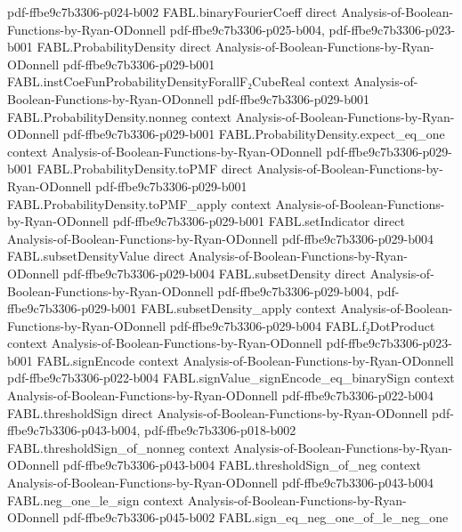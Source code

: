 \begin{theorem}
  {pdf-ffbe9c7b3306-p024-b002}
\proofstep
  {FABL.binaryFourierCoeff}
  {direct}
  {Analysis-of-Boolean-Functions-by-Ryan-ODonnell}
  {pdf-ffbe9c7b3306-p025-b004,
    pdf-ffbe9c7b3306-p023-b001}
\proofstep
  {FABL.ProbabilityDensity}
  {direct}
  {Analysis-of-Boolean-Functions-by-Ryan-ODonnell}
  {pdf-ffbe9c7b3306-p029-b001}
\proofstep
  {FABL.instCoeFunProbabilityDensityForallF₂CubeReal}
  {context}
  {Analysis-of-Boolean-Functions-by-Ryan-ODonnell}
  {pdf-ffbe9c7b3306-p029-b001}
\proofstep
  {FABL.ProbabilityDensity.nonneg}
  {context}
  {Analysis-of-Boolean-Functions-by-Ryan-ODonnell}
  {pdf-ffbe9c7b3306-p029-b001}
\proofstep
  {FABL.ProbabilityDensity.expect_eq_one}
  {context}
  {Analysis-of-Boolean-Functions-by-Ryan-ODonnell}
  {pdf-ffbe9c7b3306-p029-b001}
\proofstep
  {FABL.ProbabilityDensity.toPMF}
  {direct}
  {Analysis-of-Boolean-Functions-by-Ryan-ODonnell}
  {pdf-ffbe9c7b3306-p029-b001}
\proofstep
  {FABL.ProbabilityDensity.toPMF_apply}
  {context}
  {Analysis-of-Boolean-Functions-by-Ryan-ODonnell}
  {pdf-ffbe9c7b3306-p029-b001}
\proofstep
  {FABL.setIndicator}
  {direct}
  {Analysis-of-Boolean-Functions-by-Ryan-ODonnell}
  {pdf-ffbe9c7b3306-p029-b004}
\proofstep
  {FABL.subsetDensityValue}
  {direct}
  {Analysis-of-Boolean-Functions-by-Ryan-ODonnell}
  {pdf-ffbe9c7b3306-p029-b004}
\proofstep
  {FABL.subsetDensity}
  {direct}
  {Analysis-of-Boolean-Functions-by-Ryan-ODonnell}
  {pdf-ffbe9c7b3306-p029-b004,
    pdf-ffbe9c7b3306-p029-b001}
\proofstep
  {FABL.subsetDensity_apply}
  {context}
  {Analysis-of-Boolean-Functions-by-Ryan-ODonnell}
  {pdf-ffbe9c7b3306-p029-b004}
\proofstep
  {FABL.f₂DotProduct}
  {context}
  {Analysis-of-Boolean-Functions-by-Ryan-ODonnell}
  {pdf-ffbe9c7b3306-p023-b001}
\proofstep
  {FABL.signEncode}
  {context}
  {Analysis-of-Boolean-Functions-by-Ryan-ODonnell}
  {pdf-ffbe9c7b3306-p022-b004}
\proofstep
  {FABL.signValue_signEncode_eq_binarySign}
  {context}
  {Analysis-of-Boolean-Functions-by-Ryan-ODonnell}
  {pdf-ffbe9c7b3306-p022-b004}
\proofstep
  {FABL.thresholdSign}
  {direct}
  {Analysis-of-Boolean-Functions-by-Ryan-ODonnell}
  {pdf-ffbe9c7b3306-p043-b004,
    pdf-ffbe9c7b3306-p018-b002}
\proofstep
  {FABL.thresholdSign_of_nonneg}
  {context}
  {Analysis-of-Boolean-Functions-by-Ryan-ODonnell}
  {pdf-ffbe9c7b3306-p043-b004}
\proofstep
  {FABL.thresholdSign_of_neg}
  {context}
  {Analysis-of-Boolean-Functions-by-Ryan-ODonnell}
  {pdf-ffbe9c7b3306-p043-b004}
\proofstep
  {FABL.neg_one_le_sign}
  {context}
  {Analysis-of-Boolean-Functions-by-Ryan-ODonnell}
  {pdf-ffbe9c7b3306-p045-b002}
\proofstep
  {FABL.sign_eq_neg_one_of_le_neg_one}

\end{theorem}
